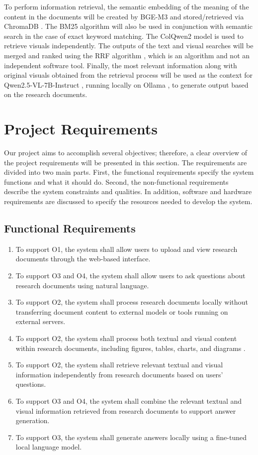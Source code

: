 \documentclass[11pt,a4paper]{report}
\begin{document}
To perform information retrieval, the semantic embedding of the meaning of the content in the documents will be created by BGE-M3 \cite{Chen2024M3EmbeddingMM} and stored/retrieved via ChromaDB \cite{huber2026chroma}. The \ac{BM25} algorithm \cite{Robertson2009ThePR} will also be used in conjunction with semantic search in the case of exact keyword matching. The ColQwen2 model \cite{Faysse2024ColPaliED} is used to retrieve visuals independently. The outputs of the text and visual searches will be merged and ranked using the \ac{RRF} algorithm \cite{Cormack2009ReciprocalRF}, which is an algorithm and not an independent software tool. Finally, the most relevant information along with original visuals obtained from the retrieval process will be used as the context for Qwen2.5-VL-7B-Instruct \cite{Bai2025Qwen25VLTR}, running locally on Ollama \cite{morgan2026ollama}, to generate output based on the research documents.

\cleardoublepage
\section{Project Requirements}
Our project aims to accomplish several objectives; therefore, a clear overview of the project requirements will be presented in this section. The requirements are divided into two main parts. First, the functional requirements specify the system functions and what it should do. Second, the non-functional requirements describe the system constraints and qualities. In addition, software and hardware requirements are discussed to specify the resources needed to develop the system.

\subsection{Functional Requirements}
\begin{enumerate}
  \item To support O1, the system shall allow users to upload and view research documents through the web-based interface.
  \item To support O3 and O4, the system shall allow users to ask questions about research documents using natural language.
  \item To support O2, the system shall process research documents locally without transferring document content to external models or tools running on external servers.
  \item To support O2, the system shall process both textual and visual content within research documents, including figures, tables, charts, and diagrams .
  \item To support O2, the system shall retrieve relevant textual and visual information independently from research documents based on users’ questions.
  \item To support O3 and O4, the system shall combine the relevant textual and visual information retrieved from research documents to support answer generation.
  \item To support O3, the system shall generate answers locally using a fine-tuned local language model. 
\end{enumerate}
\end{document}
